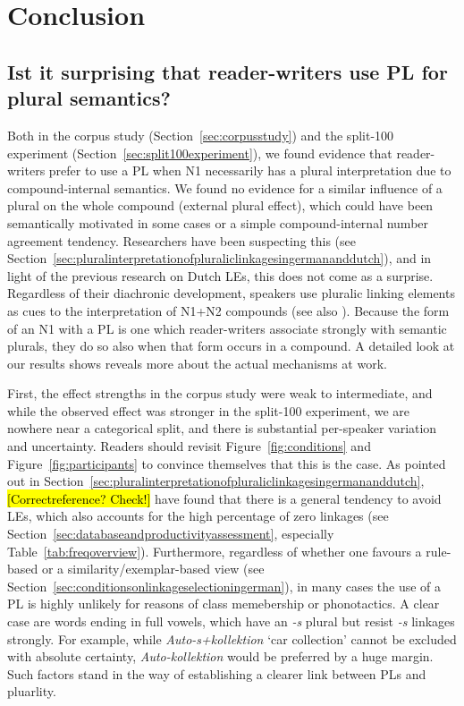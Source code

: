 \section{Conclusion}
\label{sec:conclusion}

\subsection{Ist it surprising that reader-writers use PL for plural semantics?}

Both in the corpus study (Section~\ref{sec:corpusstudy}) and the split-100 experiment (Section~\ref{sec:split100experiment}), we found evidence that reader-writers prefer to use a PL when N1 necessarily has a plural interpretation due to compound-internal semantics.
We found no evidence for a similar influence of a plural on the whole compound (external plural effect), which could have been semantically motivated in some cases or a simple compound-internal number agreement tendency.
Researchers have been suspecting this (see Section~\ref{sec:pluralinterpretationofpluraliclinkagesingermananddutch}), and in light of the previous research on Dutch LEs, this does not come as a surprise.
Regardless of their diachronic development, speakers use pluralic linking elements as cues to the interpretation of N1+N2 compounds (see also \citealt[212]{BangaEa2013b}).
Because the form of an N1 with a PL is one which reader-writers associate strongly with semantic plurals, they do so also when that form occurs in a compound.
A detailed look at our results shows reveals more about the actual mechanisms at work.

First, the effect strengths in the corpus study were weak to intermediate, and while the observed effect was stronger in the split-100 experiment, we are nowhere near a categorical split, and there is substantial per-speaker variation and uncertainty.
Readers should revisit Figure~\ref{fig:conditions} and Figure~\ref{fig:participants} to convince themselves that this is the case.
As pointed out in Section~\ref{sec:pluralinterpretationofpluraliclinkagesingermananddutch}, \textcite{LibbenEa2002} \hl{[Correctreference? Check!]} have found that there is a general tendency to avoid LEs, which also accounts for the high percentage of zero linkages (see Section~\ref{sec:databaseandproductivityassessment}, especially Table~\ref{tab:freqoverview}).
Furthermore, regardless of whether one favours a rule-based or a similarity\slash exemplar-based view (see Section~\ref{sec:conditionsonlinkageselectioningerman}), in many cases the use of a PL is highly unlikely for reasons of class memebership or phonotactics.
A clear case are words ending in full vowels, which have an \textit{-s} plural but resist \textit{-s} linkages strongly.
For example, while \textit{Auto-s+kollektion} `car collection' cannot be excluded with absolute certainty, \textit{Auto-kollektion} would be preferred by a huge margin.
Such factors stand in the way of establishing a clearer link between PLs and pluarlity.

